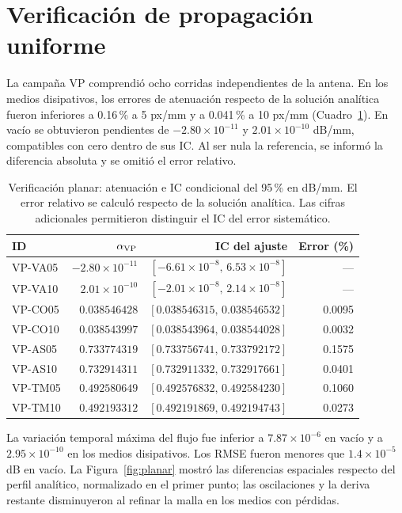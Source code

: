 \section{Verificación de propagación uniforme}\label{sec:resultados-planar}
La campaña VP comprendió ocho corridas independientes de la antena. En los medios disipativos, los errores de atenuación respecto de la solución analítica fueron inferiores a 0.16\,\% a 5 px/mm y a 0.041\,\% a 10 px/mm (Cuadro~\ref{tab:planar}). En vacío se obtuvieron pendientes de $-2.80\times10^{-11}$ y $2.01\times10^{-10}$ dB/mm, compatibles con cero dentro de sus IC. Al ser nula la referencia, se informó la diferencia absoluta y se omitió el error relativo.

\begin{table}[htbp]\centering\footnotesize
\caption{Verificación planar: atenuación e IC condicional del 95\,\% en dB/mm. El error relativo se calculó respecto de la solución analítica. Las cifras adicionales permitieron distinguir el IC del error sistemático.}\label{tab:planar}
\begin{tabular}{lrrr}\hline
ID & $\alpha_{\rm VP}$ & IC del ajuste & Error (\%) \\ \hline
VP-VA05 & $-2.80\times10^{-11}$ & $[-6.61\times10^{-8},\,6.53\times10^{-8}]$ & --- \\
VP-VA10 & $2.01\times10^{-10}$ & $[-2.01\times10^{-8},\,2.14\times10^{-8}]$ & --- \\
VP-CO05 & $0.038546428$ & $[0.038546315,\,0.038546532]$ & 0.0095 \\
VP-CO10 & $0.038543997$ & $[0.038543964,\,0.038544028]$ & 0.0032 \\
VP-AS05 & $0.733774319$ & $[0.733756741,\,0.733792172]$ & 0.1575 \\
VP-AS10 & $0.732914311$ & $[0.732911332,\,0.732917661]$ & 0.0401 \\
VP-TM05 & $0.492580649$ & $[0.492576832,\,0.492584230]$ & 0.1060 \\
VP-TM10 & $0.492193312$ & $[0.492191869,\,0.492194743]$ & 0.0273 \\
\hline\end{tabular}\end{table}

La variación temporal máxima del flujo fue inferior a $7.87\times10^{-6}$ en vacío y a $2.95\times10^{-10}$ en los medios disipativos. Los RMSE fueron menores que $1.4\times10^{-5}$ dB en vacío. La Figura~\ref{fig:planar} mostró las diferencias espaciales respecto del perfil analítico, normalizado en el primer punto; las oscilaciones y la deriva restante disminuyeron al refinar la malla en los medios con pérdidas.

